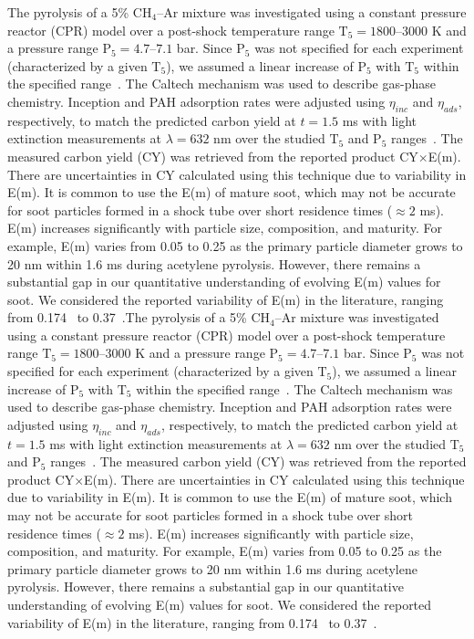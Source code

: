 The pyrolysis of a 5\% $\mathrm{CH_4}$--Ar mixture was investigated using a constant pressure reactor (CPR) model over a post-shock temperature range $\mathrm{T_5} = 1800$--$3000$ K and a pressure range $\mathrm{P_5} = 4.7$--$7.1$ bar. Since $\mathrm{P_5}$ was not specified for each experiment (characterized by a given $\mathrm{T_5}$), we assumed a linear increase of $\mathrm{P_5}$ with $\mathrm{T_5}$ within the specified range~\citep{agafonov2016unified}. The Caltech mechanism was used to describe gas-phase chemistry. Inception and PAH adsorption rates were adjusted using $\eta_{inc}$ and $\eta_{ads}$, respectively, to match the predicted carbon yield at $t = 1.5$ ms with light extinction measurements at $\lambda = 632$ nm over the studied $\mathrm{T_5}$ and $\mathrm{P_5}$ ranges~\citep{agafonov2016unified}. The measured carbon yield (CY) was retrieved from the reported product CY$\times$E(m). There are uncertainties in CY calculated using this technique due to variability in E(m). It is common to use the E(m) of mature soot, which may not be accurate for soot particles formed in a shock tube over short residence times ($\approx 2$ ms). E(m) increases significantly with particle size, composition, and maturity. For example, E(m) varies from 0.05 to 0.25 as the primary particle diameter grows to 20 nm within 1.6 ms during acetylene pyrolysis. However, there remains a substantial gap in our quantitative understanding of evolving E(m) values for soot. We considered the reported variability of E(m) in the literature, ranging from 0.174~\citep{lee1981optical} to 0.37~\citep{agafonov2011soot}.The pyrolysis of a 5\% $\mathrm{CH_4}$--Ar mixture was investigated using a constant pressure reactor (CPR) model over a post-shock temperature range $\mathrm{T_5} = 1800$--$3000$ K and a pressure range $\mathrm{P_5} = 4.7$--$7.1$ bar. Since $\mathrm{P_5}$ was not specified for each experiment (characterized by a given $\mathrm{T_5}$), we assumed a linear increase of $\mathrm{P_5}$ with $\mathrm{T_5}$ within the specified range~\citep{agafonov2016unified}. The Caltech mechanism was used to describe gas-phase chemistry. Inception and PAH adsorption rates were adjusted using $\eta_{inc}$ and $\eta_{ads}$, respectively, to match the predicted carbon yield at $t = 1.5$ ms with light extinction measurements at $\lambda = 632$ nm over the studied $\mathrm{T_5}$ and $\mathrm{P_5}$ ranges~\citep{agafonov2016unified}. The measured carbon yield (CY) was retrieved from the reported product CY$\times$E(m). There are uncertainties in CY calculated using this technique due to variability in E(m). It is common to use the E(m) of mature soot, which may not be accurate for soot particles formed in a shock tube over short residence times ($\approx 2$ ms). E(m) increases significantly with particle size, composition, and maturity. For example, E(m) varies from 0.05 to 0.25 as the primary particle diameter grows to 20 nm within 1.6 ms during acetylene pyrolysis. However, there remains a substantial gap in our quantitative understanding of evolving E(m) values for soot. We considered the reported variability of E(m) in the literature, ranging from 0.174~\citep{lee1981optical} to 0.37~\citep{agafonov2011soot}.

